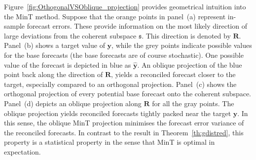 \documentclass[12pt]{article}
\theoremstyle{definition}
\begin{document}
Figure~\ref{fig:OthogonalVSOblique_projection} provides geometrical intuition into the MinT method. Suppose that the orange points in panel~(a) represent in-sample forecast errors. These provide information on the most likely direction of large deviations from the coherent subspace $\mathfrak{s}$. This direction is denoted by $\bm{R}$. Panel~(b) shows a target value of $\bm{y}$, while the grey points indicate possible values for the base forecasts (the base forecasts are of course stochastic). One possible value of the forecast is depicted in blue as $\hat{\bm{y}}$. An oblique projection of the blue point back along the direction of $\bm{R}$, yields a reconciled forecast closer to the target, especially compared to an orthogonal projection. Panel~(c) shows the orthogonal projection of every potential base forecast onto the coherent subspace. Panel~(d) depicts an oblique projection along $\bm{R}$ for all the gray points. The oblique projection yields reconciled forecasts tightly packed near the target $\bm{y}$. In this sense, the oblique MinT projection minimises the forecast error variance of the reconciled forecasts. In contrast to the result in Theorem~\ref{th:gdistred}, this property is a statistical property in the sense that MinT is optimal in expectation.
\end{document}
